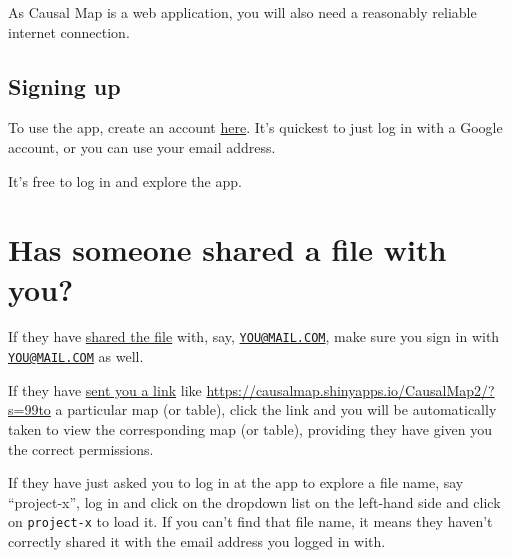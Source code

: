 \documentclass[
]{book}
\begin{document}
As Causal Map is a web application, you will also need a reasonably reliable internet connection.

\hypertarget{signing-up}{%
\section{Signing up}\label{signing-up}}

To use the app, create an account \href{https://causalmap.shinyapps.io/CausalMap2/}{here}. It's quickest to just log in with a Google account, or you can use your email address.

It's free to log in and explore the app.

\hypertarget{xinvite}{%
\chapter{Has someone shared a file with you?}\label{xinvite}}

If they have \protect\hyperlink{xpermissions}{shared the file} with, say, \href{mailto:YOU@MAIL.COM}{\nolinkurl{YOU@MAIL.COM}}, make sure you sign in with \href{mailto:YOU@MAIL.COM}{\nolinkurl{YOU@MAIL.COM}} as well.

If they have \protect\hyperlink{xinvite}{sent you a link} like \url{https://causalmap.shinyapps.io/CausalMap2/?s=99to} a particular map (or table), click the link and you will be automatically taken to view the corresponding map (or table), providing they have given you the correct permissions.

If they have just asked you to log in at the app to explore a file name, say ``project-x'', log in and click on the dropdown list on the left-hand side and click on \texttt{project-x} to load it. If you can't find that file name, it means they haven't correctly shared it with the email address you logged in with.
\end{document}
